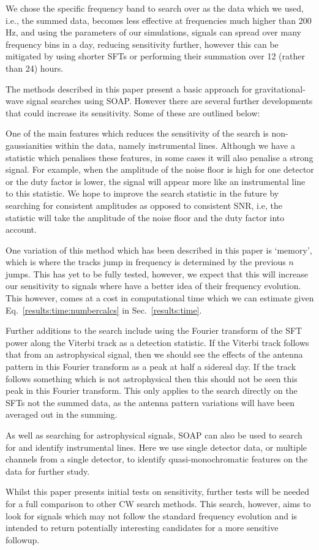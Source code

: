 We chose the specific frequency band to search over as the data which we used, i.e., the summed data, becomes less effective at frequencies much higher than 200\,Hz, and using the parameters of our simulations, signals can spread over many frequency bins in a day, reducing sensitivity further, however this can be mitigated by using shorter \acp{SFT} or performing their summation over 12 (rather than 24) hours.

%
%
The methods described in this paper present a basic approach for gravitational-wave signal searches using SOAP. However there are several further developments that could increase its sensitivity. Some of these are outlined below:

One of the main features which reduces the sensitivity of the search is non-gaussianities within the data, namely instrumental lines. Although we have a statistic which penalises these features, in some cases it will also penalise a strong signal. For example, when the amplitude of the noise floor is high for one detector or the duty factor is lower, the signal will appear more like an instrumental line to this statistic. We hope to improve the search statistic in the future by searching for consistent amplitudes as opposed to consistent \ac{SNR}, i.e, the statistic will take the amplitude of the noise floor and the duty factor into account.

One variation of this method which has been described in this paper is `memory', which is where the tracks jump in frequency is determined by the previous $n$ jumps. This has yet to be fully tested, however, we expect that this will increase our sensitivity to signals where have a better idea of their frequency evolution. This however, comes at a cost in computational time which we can estimate given Eq.~\ref{results:time:numbercalcs} in Sec.~\ref{results:time}.

Further additions to the search include using the Fourier transform of the \ac{SFT} power along the Viterbi track as a detection statistic.
If the Viterbi track follows that from an astrophysical signal, then we should see the effects of the antenna pattern in this Fourier transform as a peak at half a sidereal day.
If the track follows something which is not astrophysical then this should not be seen this peak in this Fourier transform.
This only applies to the search directly on the \acp{SFT} not the summed data, as the antenna pattern variations will have been averaged out in the summing.

As well as searching for astrophysical signals, SOAP can also be used to search for and identify instrumental lines. Here we use single detector data, or multiple channels from a single detector, to identify quasi-monochromatic features on the data for further study.

Whilst this paper presents initial tests on sensitivity, further tests will be needed for a full comparison to other \ac{CW} search methods.  
This search, however, aims to look for signals which may not follow the standard
frequency evolution and is intended to return potentially interesting
candidates for a more sensitive followup.

